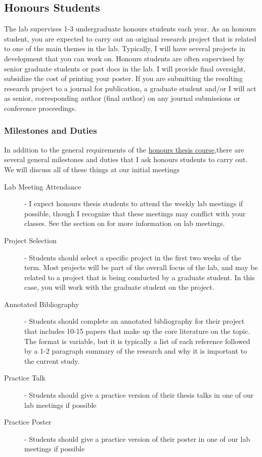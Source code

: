 \documentclass{article}
\begin{document}
\subsection {Honours Students}
The lab supervises 1-3 undergraduate honours students each year. As an honours student, you are expected to carry out an original research project that is related to one of the main themes in the lab. Typically, I will have several projects in development that you can work on. Honours students are often supervised by senior graduate students or post docs in the lab. I will provide final oversight, subsidize the cost of printing your poster. If you are submitting the resulting research project to a journal for publication, a graduate student and/or I will act as senior, corresponding author (final author) on any journal submissions or conference proceedings.

\subsubsection{Milestones and Duties}
In addition to the general requirements of the \href{http://psychology.uwo.ca/undergraduate/honors_thesis/index.html} {honours thesis course},there are several general milestones and duties that I ask honours students to carry out. We will discuss all of these things at our initial meetings 


\begin{description}
\item [Lab Meeting Attendance] - I expect honours thesis students to attend the weekly lab meetings if possible, though I recognize that these meetings may conflict with your classes. See the section on  for more information on lab meetings.

\item [Project Selection] - Students should select a specific project in the first two weeks of the term. Most projects will be part of the overall focus of the lab, and may be related to a project that is being conducted by a graduate student. In this case, you will work with the graduate student on the project. 

\item [Annotated Bibliography] - Students should complete an annotated bibliography for their project that includes 10-15 papers that make up the core literature on the topic. The format is variable, but it is typically a list of each reference followed by a 1-2 paragraph summary of the research and why it is important to the current study. 

\item [Practice Talk] - Students should give a practice version of their thesis talks in one of our lab meetings if possible

\item [Practice Poster] - Students should give a practice version of their poster in one of our lab meetings if possible
\end{description}
\end{document}
